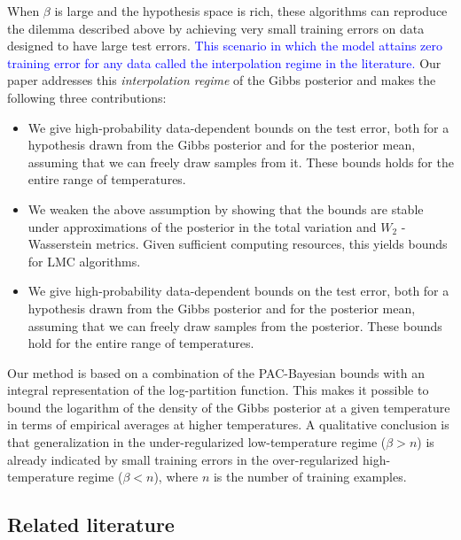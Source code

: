 \documentclass{article} %
\newcommand{\EM}[1]{\textcolor{blue}{#1}}
\begin{document}
When $\beta$ is large and the hypothesis space is rich, these algorithms can reproduce the dilemma described above by achieving very small training errors on data designed to have large test errors. \EM{This scenario in which the model attains zero training error for any data called the interpolation regime in the literature.}
Our paper addresses this \textit{interpolation regime} of the Gibbs posterior and makes the following three
contributions:
\begin{itemize}
    \item We give high-probability data-dependent bounds on the test error, both for a hypothesis drawn from the Gibbs posterior and for the posterior mean, assuming that we can freely draw samples from it.  These bounds holds for the entire range of temperatures.
    \item We weaken the above assumption by showing that the bounds are stable
    under approximations of the posterior in the total variation and $W_{2}$%
    -Wasserstein metrics. Given sufficient computing resources, this yields bounds for LMC algorithms.  
    \item We give high-probability data-dependent bounds on the test error, both for a hypothesis drawn from the Gibbs posterior and for the posterior mean, assuming that we can freely draw samples from the posterior.  These bounds hold for the entire range of temperatures.
\end{itemize}
Our method is based on a combination of the PAC-Bayesian bounds \citep{mcallester1999pac,alquier2021user,rivasplata2020pac} with
an integral representation of the log-partition function. This makes it possible to
bound the logarithm of the density of the Gibbs posterior at a given temperature in terms of empirical averages at higher temperatures. A qualitative conclusion is that generalization in the under-regularized low-temperature regime ($\beta >n$) is already indicated by small training errors in the over-regularized high-temperature regime ($\beta <n$), where $n$ is the number of training examples.

\subsection{Related literature}
\end{document}
